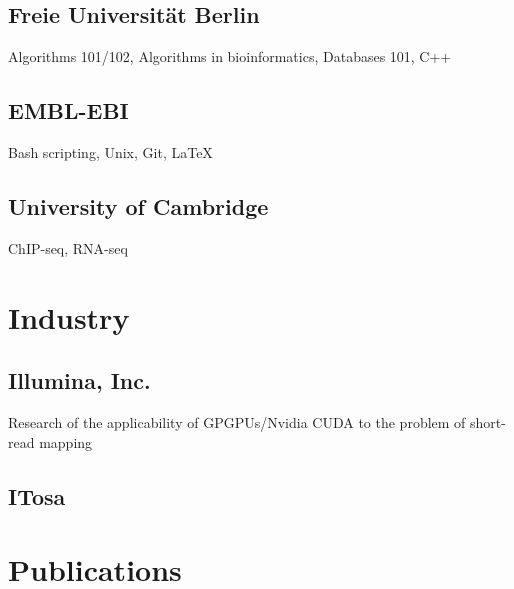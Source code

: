 \documentclass{klmr-cv}
\newcommand*\cpp{C++}
\begin{document}
\subsection{Freie Universität Berlin}

\date{2008--2011}
\item{}
\item{Algorithms 101/102, Algorithms in bioinformatics, Databases 101, \cpp}

\subsection{EMBL-EBI}

\date{2011--2014}
\item{}
\item{Bash scripting, Unix, Git, \LaTeX}

\subsection{University of Cambridge}

\date{2013--2015}
\item{}
\item{ChIP-seq, RNA-seq}

\section{Industry}

\subsection{Illumina, Inc.}

\date{Oct 2008--Feb 2009}
\item{}
\item{Research of the applicability of GPGPUs/Nvidia CUDA to the problem of
        short-read mapping}

\subsection{ITosa}

\date{Jan 2007--Jan 2008}
\item{}

\section{Publications}
\end{document}
